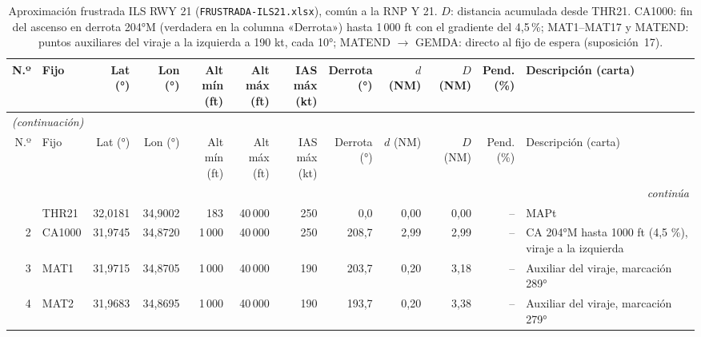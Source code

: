 \begingroup\scriptsize\setlength{\tabcolsep}{2.8pt}
\begin{longtable}{rlrrrrrrrrr>{\raggedright\arraybackslash}p{3.4cm}}
\caption{Aproximación frustrada ILS RWY 21 (\texttt{FRUSTRADA-ILS21.xlsx}), común a la RNP Y 21. $D$: distancia acumulada desde THR21. CA1000: fin del ascenso en derrota 204°M (verdadera en la columna «Derrota») hasta 1\,000 ft con el gradiente del 4,5\,\%; MAT1--MAT17 y MATEND: puntos auxiliares del viraje a la izquierda a 190 kt, cada 10°; MATEND $\rightarrow$ GEMDA: directo al fijo de espera (suposición~17).}\label{tab:frustrada}\\
\toprule
N.º & Fijo & Lat (°) & Lon (°) & \makecell{Alt mín\\(ft)} & \makecell{Alt máx\\(ft)} & \makecell{IAS máx\\(kt)} & \makecell{Derrota\\(°)} & \makecell{$d$\\(NM)} & \makecell{$D$\\(NM)} & \makecell{Pend.\\(\%)} & Descripción (carta)\\
\midrule
\endfirsthead
\multicolumn{12}{l}{\small\itshape (continuación)}\\
\toprule
N.º & Fijo & Lat (°) & Lon (°) & \makecell{Alt mín\\(ft)} & \makecell{Alt máx\\(ft)} & \makecell{IAS máx\\(kt)} & \makecell{Derrota\\(°)} & \makecell{$d$\\(NM)} & \makecell{$D$\\(NM)} & \makecell{Pend.\\(\%)} & Descripción (carta)\\
\midrule
\endhead
\midrule
\multicolumn{12}{r}{\small\itshape continúa}\\
\endfoot
\bottomrule
\endlastfoot
1 & THR21 & 32,0181 & 34,9002 & 183 & 40\,000 & 250 & 0,0 & 0,00 & 0,00 & -- & \scriptsize MAPt\\
2 & CA1000 & 31,9745 & 34,8720 & 1\,000 & 40\,000 & 250 & 208,7 & 2,99 & 2,99 & -- & \scriptsize CA 204°M hasta 1000 ft (4,5 \%), viraje a la izquierda\\
3 & MAT1 & 31,9715 & 34,8705 & 1\,000 & 40\,000 & 190 & 203,7 & 0,20 & 3,18 & -- & \scriptsize Auxiliar del viraje, marcación 289°\\
4 & MAT2 & 31,9683 & 34,8695 & 1\,000 & 40\,000 & 190 & 193,7 & 0,20 & 3,38 & -- & \scriptsize Auxiliar del viraje, marcación 279°\\

\end{longtable}
